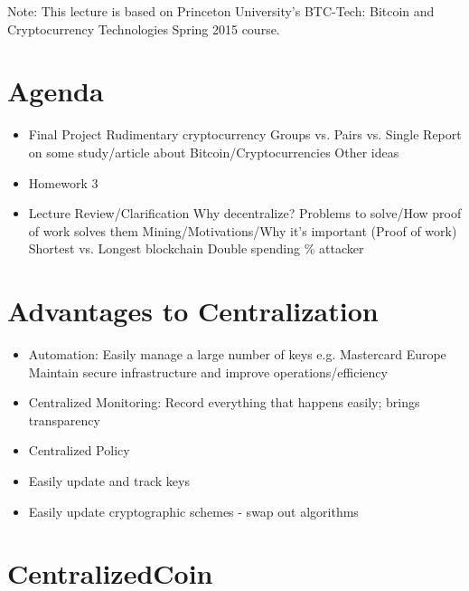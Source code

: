 \documentclass{article}
\begin{document}
\maketitle

Note: This lecture is based on Princeton University's BTC-Tech: Bitcoin and Cryptocurrency Technologies Spring 2015 course.

\section*{Agenda}
\begin{itemize}
  \item Final Project
    \subitem Rudimentary cryptocurrency
    \subitem Groups vs. Pairs vs. Single
    \subitem Report on some study/article about Bitcoin/Cryptocurrencies
    \subitem Other ideas
  \item Homework 3
  \item Lecture Review/Clarification
    \subitem Why decentralize?
    \subitem Problems to solve/How proof of work solves them
    \subitem Mining/Motivations/Why it's important (Proof of work)
    \subitem Shortest vs. Longest blockchain
    \subitem Double spending
    \% attacker
\end{itemize}

\section*{Advantages to Centralization}
\begin{itemize}
  \item Automation:
    \subitem Easily manage a large number of keys e.g. Mastercard Europe
    \subitem Maintain secure infrastructure and improve operations/efficiency
  \item Centralized Monitoring:
    \subitem Record everything that happens easily; brings transparency
  \item Centralized Policy
  \item Easily update and track keys
  \item Easily update cryptographic schemes - swap out algorithms
\end{itemize}

\section*{CentralizedCoin}
\end{document}
